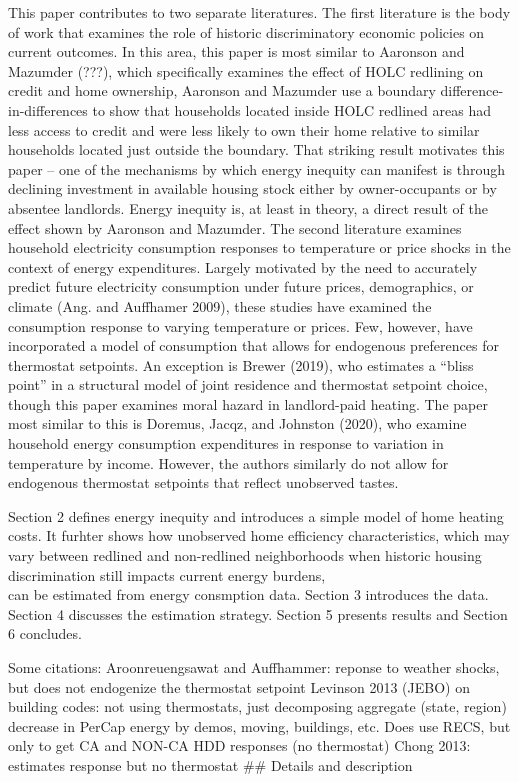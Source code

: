 \documentclass[
]{article}
\begin{document}
This paper contributes to two separate literatures. The first literature
is the body of work that examines the role of historic discriminatory
economic policies on current outcomes. In this area, this paper is most
similar to Aaronson and Mazumder (???), which specifically examines the
effect of HOLC redlining on credit and home ownership, Aaronson and
Mazumder use a boundary difference-in-differences to show that
households located inside HOLC redlined areas had less access to credit
and were less likely to own their home relative to similar households
located just outside the boundary. That striking result motivates this
paper -- one of the mechanisms by which energy inequity can manifest is
through declining investment in available housing stock either by
owner-occupants or by absentee landlords. Energy inequity is, at least
in theory, a direct result of the effect shown by Aaronson and Mazumder.
The second literature examines household electricity consumption
responses to temperature or price shocks in the context of energy
expenditures. Largely motivated by the need to accurately predict future
electricity consumption under future prices, demographics, or climate
(Ang. and Auffhamer 2009), these studies have examined the consumption
response to varying temperature or prices. Few, however, have
incorporated a model of consumption that allows for endogenous
preferences for thermostat setpoints. An exception is Brewer (2019), who
estimates a ``bliss point'' in a structural model of joint residence and
thermostat setpoint choice, though this paper examines moral hazard in
landlord-paid heating. The paper most similar to this is Doremus, Jacqz,
and Johnston (2020), who examine household energy consumption
expenditures in response to variation in temperature by income. However,
the authors similarly do not allow for endogenous thermostat setpoints
that reflect unobserved tastes.

Section 2 defines energy inequity and introduces a simple model of home
heating costs. It furhter shows how unobserved home efficiency
characteristics, which may vary between redlined and non-redlined
neighborhoods when historic housing discrimination still impacts current
energy burdens,\\
can be estimated from energy consmption data. Section 3 introduces the
data. Section 4 discusses the estimation strategy. Section 5 presents
results and Section 6 concludes.

Some citations: Aroonreuengsawat and Auffhammer: reponse to weather
shocks, but does not endogenize the thermostat setpoint Levinson 2013
(JEBO) on building codes: not using thermostats, just decomposing
aggregate (state, region) decrease in PerCap energy by demos, moving,
buildings, etc. Does use RECS, but only to get CA and NON-CA HDD
responses (no thermostat) Chong 2013: estimates response but no
thermostat \#\# Details and description
\end{document}
